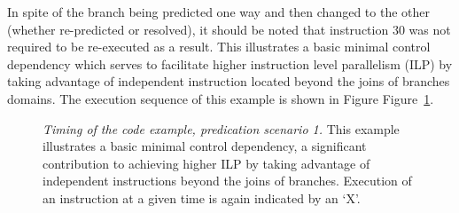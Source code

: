 In spite of the branch being predicted one way and then changed
to the other (whether re-predicted or resolved), it should be
noted that instruction 30 was not required to be re-executed as
a result.  This illustrates a basic minimal control dependency
which serves to facilitate higher instruction level parallelism (ILP)
by taking advantage of independent instruction located beyond the
joins of branches domains.
The execution sequence of this example is shown
in Figure
Figure~\ref{pex1}.

\begin{figure}
\centering
{}
\caption{{\em Timing of the code example, predication scenario 1.}
This example illustrates a basic minimal control
dependency, a significant contribution to
achieving higher ILP by taking advantage of independent
instructions beyond the joins of branches.
Execution of an instruction at a given time is
again indicated by an `X'.}
\label{pex1}
\end{figure}

